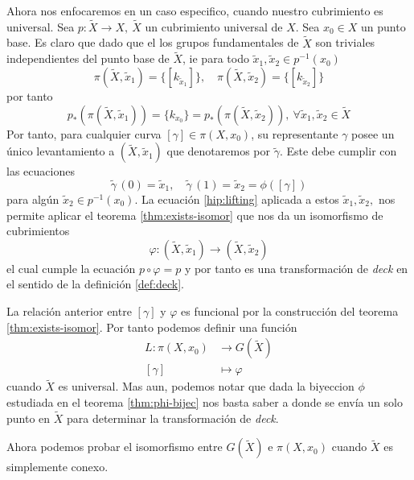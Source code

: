 Ahora nos enfocaremos en un caso especifico, cuando nuestro cubrimiento
es universal. Sea \(p : \tilde X \to X,\ \tilde X\) un
cubrimiento universal de \(X\). Sea \(x_0 \in X\) un punto base. Es
claro que dado que el los grupos fundamentales de \(\tilde X\) son
triviales independientes del punto base de \(\tilde X\), ie para todo
\(\tilde x_1, \tilde x_2 \in p^{-1} (x_0)\)
\begin{equation*}
  \pi \left( \tilde X , \tilde x_1 \right) = \{[k_{\tilde x_1}]\},\quad
  \pi \left( \tilde X , \tilde x_2 \right) = \{ [k_{\tilde x_2}]\}
\end{equation*}
por tanto
\begin{equation} \label{hip:lifting}
  p_* \left( \pi \left( \tilde X , \tilde x_1 \right) \right) =
  \{k_{x_0}\} = p_* \left( \pi \left( \tilde X , \tilde x_2 \right)
  \right),\ \forall \tilde x_1 , \tilde x_2 \in \tilde X
\end{equation}
Por tanto, para cualquier curva \([\gamma] \in \pi (X , x_0)\), su
representante \(\gamma\) posee un único levantamiento a \((\tilde X,
\tilde x_1)\) que denotaremos por \(\tilde \gamma\). Este debe cumplir
con las ecuaciones
\[ \tilde \gamma \, (0) = \tilde x_1, \quad \tilde \gamma \, (1) =
  \tilde x_2 = \phi ([\gamma]) \]
para algún \(\tilde x_2 \in p^{-1} (x_0)\). La ecuación
\eqref{hip:lifting} aplicada a estos \(\tilde x_1, \tilde x_2,\) nos
permite aplicar el teorema \ref{thm:exists-isomor} que nos da un
isomorfismo de cubrimientos
\[\varphi : (\tilde X , \tilde x_1) \to (\tilde X , \tilde x_2 ) \]
el cual cumple la ecuación \(p \circ \varphi = p\) y por tanto es una
transformación de \emph{deck} en el sentido de la definición
\ref{def:deck}.

La relación anterior entre \([\gamma]\) y \(\varphi\) es funcional por
la construcción del teorema \ref{thm:exists-isomor}. Por tanto podemos
definir una función
\begin{align}
  L : \pi (X, x_0) &\longrightarrow G (\tilde X) \label{def:L} \\
  [\gamma] &\longmapsto \varphi \nonumber
\end{align}
cuando \(\tilde X\) es universal. Mas aun, podemos notar que dada la
biyeccion \(\phi\) estudiada en el teorema \ref{thm:phi-bijec} nos basta
saber a donde se envía un solo punto en \(\tilde X\) para determinar la
transformación de \emph{deck}.

Ahora podemos probar el isomorfismo entre \(G (\tilde X)\) e \(\pi (X,
x_0)\) cuando \(\tilde X\) es simplemente conexo.

